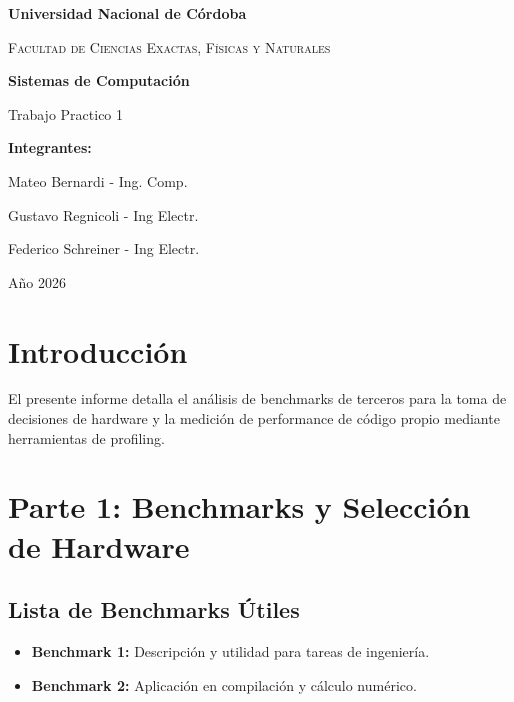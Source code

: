 \documentclass[12pt,a4paper]{article}
\begin{document}
	
	\begin{titlepage}
		\centering
		{\bfseries\LARGE Universidad Nacional de Córdoba \par}
		{\scshape\Large Facultad de Ciencias Exactas, Físicas y Naturales \par}
		\vspace{2cm}
		\vspace{1.5cm}
		{\bfseries\huge Sistemas de Computación \par}
		\vspace{1cm}
		{\Large Trabajo Practico 1\par}
		\vspace{2cm}
		
		{\Large \textbf{Integrantes:}} \par
		\vspace{0.5cm}
		{\large Mateo Bernardi - Ing. Comp.\par}
		{\large Gustavo Regnicoli - Ing Electr.\par}
			{\large Federico Schreiner - Ing Electr.\par}
		
		\vfill
		{\Large Año 2026 \par}
	\end{titlepage}
	
	\newpage
	\tableofcontents %
	\newpage
	
	\section{Introducción}
	El presente informe detalla el análisis de benchmarks de terceros para la toma de decisiones de hardware y la medición de performance de código propio mediante herramientas de profiling.
	
	\section{Parte 1: Benchmarks y Selección de Hardware}
	
	\subsection{Lista de Benchmarks Útiles}
	\begin{itemize}
		\item \textbf{Benchmark 1:} Descripción y utilidad para tareas de ingeniería.
		\item \textbf{Benchmark 2:} Aplicación en compilación y cálculo numérico.
	\end{itemize}
	
\end{document}
